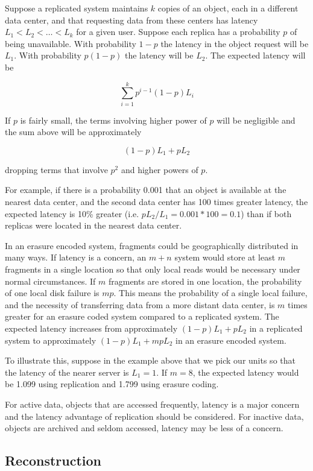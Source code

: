 Suppose a replicated system maintains $k$ copies of an object, each in a different data center, and that requesting data from these centers has latency $L_1 < L_2 < \ldots < L_k$ for a given user. Suppose each replica has a probability $p$ of being unavailable. With probability $1-p$ the latency in the object request will be $L_1$. With probability $p(1-p)$ the latency will be $L_2$. The expected latency will be

\[ \sum_{i=1}^k p^{i-1}(1-p) L_i \]

If $p$ is fairly small, the terms involving higher power of $p$ will be negligible and the sum above will be approximately

\[ (1-p)L_1 + p L_2\]

dropping terms that involve $p^2$ and higher powers of $p$.

For example, if there is a probability 0.001 that an object is available at the nearest data center, and the second data center has 100 times greater latency, the expected latency is 10\% greater (i.e. $p L_2/L_1 = 0.001*100 = 0.1$) than if both replicas were located in the nearest data center.

In an erasure encoded system, fragments could be geographically distributed in many ways. If latency is a concern, an $m+n$ system would store at least $m$ fragments in a single location so that only local reads would be necessary under normal circumstances. If $m$ fragments are stored in one location, the probability of one local disk failure is $mp$. This means the probability of a single local failure, and the necessity of transferring data from a more distant data center, is $m$ times greater for an erasure coded system compared to a replicated system. The expected latency increases from approximately $(1-p)L_1 + pL_2$ in a replicated system to approximately $(1-p)L_1 + mpL_2$ in an erasure encoded system. 

To illustrate this, suppose in the example above that we pick our units so that the latency of the nearer server is $L_1 = 1$. If $m = 8$, the expected latency would be 
1.099 using replication and
1.799 using erasure coding. 

For active data, objects that are accessed frequently, latency is a major concern and the latency advantage of replication should be considered. For inactive data, objects are archived and seldom accessed, latency may be less of a concern.

\subsection{Reconstruction}


